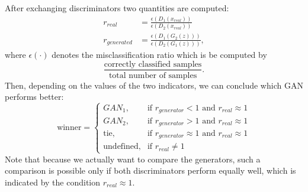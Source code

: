 After exchanging discriminators two quantities are computed:
\begin{align} \label{eq:gam_real}
	r_{real} &= \frac{\epsilon(D_1(x_{real}))}{\epsilon(D_2(x_{real}))} \\ 
	r_{generated} &= \frac{\epsilon(D_1(G_2(z)))}{\epsilon(D_2(G_1(z)))}, \label{eq:gam_gen} 
 \end{align}
where $\epsilon(\cdot)$ denotes the misclassification ratio which is be computed by 
\begin{equation*}
	\frac{\text{correctly classified samples}}{\text{total number of samples}}.
\end{equation*} 
Then, depending on the values of the two indicators, we can conclude which GAN performs better:
\begin{equation}
\text{winner} = \begin{cases}
	GAN_1, & \text{if } r_{generator} < 1 \text{ and } r_{real} \approx 1 \\
	GAN_2, & \text{if } r_{generator} > 1 \text{ and } r_{real} \approx 1 \\
	\text{tie}, & \text{if } r_{generator} \approx 1 \text{ and } r_{real} \approx 1  \\
	\text{undefined}, & \text{if } r_{real} \neq 1	
	\end{cases}
\end{equation}
Note that because we actually want to compare the generators, such a comparison is possible only if both discriminators perform equally well, which is indicated by the condition $r_{real} \approx 1$.  
